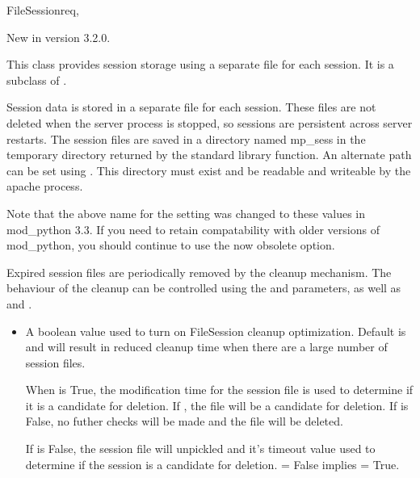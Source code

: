 \begin{classdesc}{FileSession}{req, }

  New in version 3.2.0.

  This class provides session storage using a separate file for each
  session. It is a subclass of .

  Session data is stored in a separate file for each session. These 
  files are not deleted when the server process is stopped, so
  sessions are persistent across server restarts.  
  The session files are saved in a directory named mp_sess in the 
  temporary directory returned by the  
  standard library function. An alternate path can be set using 
  . This directory must exist and be readable and
  writeable by the apache process.

  Note that the above name for the  setting was
  changed to these values in mod_python 3.3. If you need to retain
  compatability with older versions of mod_python, you should continue
  to use the now obsolete  option.

  Expired session files are periodically removed by the cleanup mechanism.
  The behaviour of the cleanup can be controlled using the
   and  parameters, as well as
   and
  .

  \begin{itemize}
  \item
    A boolean value used to turn on FileSession cleanup optimization.
    Default is  and will result in reduced cleanup time when
    there are a large number of session files.
  
    When  is True, the modification time for the session
    file is used to determine if it is a candidate for deletion.
    If ,
    the file will be a candidate for deletion. If 
    is False, no futher checks will be made and the file will be
    deleted.
    
    If  is False, the session file will unpickled and
    it's timeout value used to determine if the session is a candidate for
    deletion.  = False implies  =
    True.


\end{itemize}
\end{classdesc}
